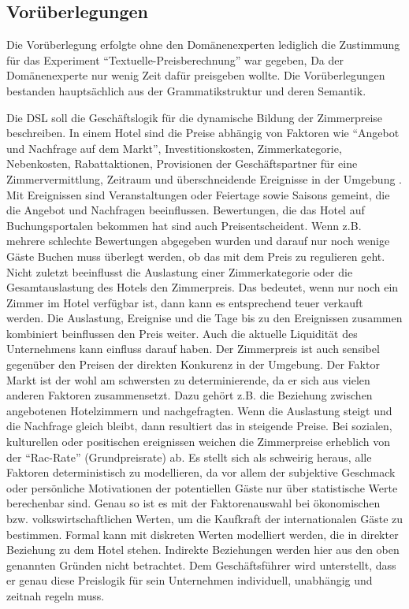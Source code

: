 \documentclass[11pt,english,ngerman, headsepline]{scrreprt}
\begin{document}
 \subsection{Vorüberlegungen}

Die Vorüberlegung erfolgte ohne den Domänenexperten lediglich die Zustimmung
für das Experiment ``Textuelle-Preisberechnung'' war gegeben, Da der
Domänenexperte nur wenig Zeit dafür preisgeben wollte. Die Vorüberlegungen
bestanden hauptsächlich aus der Grammatikstruktur und deren Semantik. 

Die DSL soll die Geschäftslogik für die dynamische Bildung der Zimmerpreise
beschreiben. In einem Hotel sind die Preise abhängig von Faktoren wie
``Angebot und Nachfrage auf dem Markt'', Investitionskosten, Zimmerkategorie,
Nebenkosten, Rabattaktionen, Provisionen der Geschäftspartner für eine
Zimmervermittlung, Zeitraum und überschneidende Ereignisse in der Umgebung
\cite[S. 44]{hahn1993tourismuspsychologie}. Mit Ereignissen sind Veranstaltungen
oder Feiertage sowie Saisons gemeint, die die Angebot und Nachfragen beeinflussen. Bewertungen, die
das Hotel auf Buchungsportalen bekommen hat sind auch Preisentscheident. Wenn
z.B. mehrere schlechte Bewertungen abgegeben wurden und darauf nur noch wenige
Gäste Buchen muss überlegt werden, ob das mit dem Preis zu regulieren geht.
Nicht zuletzt beeinflusst die Auslastung einer Zimmerkategorie oder die
Gesamtauslastung des Hotels den Zimmerpreis. Das bedeutet, wenn nur noch ein
Zimmer im Hotel verfügbar ist, dann kann es entsprechend teuer verkauft werden.
Die Auslastung, Ereignise und die Tage bis zu den Ereignissen zusammen
kombiniert beinflussen den Preis weiter. Auch die aktuelle Liquidität des
Unternehmens kann einfluss darauf haben. Der Zimmerpreis ist auch sensibel
gegenüber den Preisen der direkten Konkurenz in der Umgebung.
Der Faktor Markt ist der wohl am schwersten zu determinierende, da er sich aus
vielen anderen Faktoren zusammensetzt. Dazu gehört z.B. die Beziehung zwischen
angebotenen Hotelzimmern und nachgefragten. Wenn die Auslastung steigt und die
Nachfrage gleich bleibt, dann resultiert das in steigende Preise.
Bei sozialen, kulturellen oder positischen ereignissen weichen die Zimmerpreise
erheblich von der ``Rac-Rate'' (Grundpreisrate) ab.
Es stellt sich als schweirig heraus, alle Faktoren deterministisch zu
modellieren, da vor allem der subjektive Geschmack oder persönliche Motivationen
der potentiellen Gäste nur über statistische Werte berechenbar sind. Genau so
ist es mit der Faktorenauswahl bei ökonomischen bzw. volkswirtschaftlichen
Werten, um die Kaufkraft der internationalen Gäste zu bestimmen.
Formal kann mit diskreten Werten modelliert werden, die in direkter Beziehung zu
dem Hotel stehen. Indirekte Beziehungen werden hier aus den oben genannten
Gründen nicht betrachtet.
Dem Geschäftsführer wird unterstellt, dass er genau diese Preislogik für
sein Unternehmen individuell, unabhängig und zeitnah regeln muss.
\end{document}
